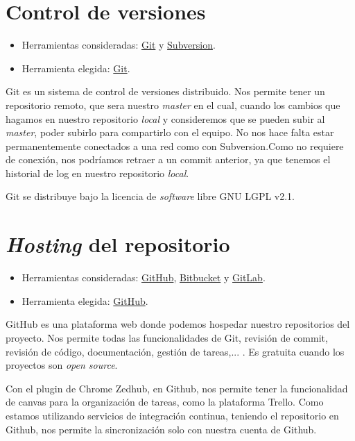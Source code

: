 
\section{Control de versiones}\label{control-de-versiones}

\begin{itemize}
	\tightlist
	\item
	Herramientas consideradas: \href{https://git-scm.com/}{Git} y
	\href{https://subversion.apache.org/}{Subversion}.
	\item
	Herramienta elegida: \href{https://git-scm.com/}{Git}.
\end{itemize}

Git es un sistema de control de versiones distribuido. Nos permite tener un repositorio remoto, que sera nuestro \emph{master} en el cual, cuando los cambios que hagamos en nuestro repositorio \emph{local} y consideremos que se pueden subir al \emph{master}, poder subirlo para compartirlo con el equipo. No nos hace falta estar permanentemente conectados a una red como con Subversion.Como no requiere de conexión, nos podríamos retraer a un commit anterior, ya que tenemos el historial de log en nuestro repositorio \emph{local}. 

Git se distribuye bajo la licencia de \emph{software} libre GNU LGPL v2.1.

\section{\emph{Hosting} del repositorio}\label{hosting-del-repositorio}

\begin{itemize}
	\tightlist
	\item
	Herramientas consideradas: \href{https://github.com/}{GitHub},
	\href{https://bitbucket.org/}{Bitbucket} y
	\href{https://gitlab.com/}{GitLab}.
	\item
	Herramienta elegida: \href{https://github.com/}{GitHub}.
\end{itemize}

GitHub es una plataforma web donde podemos hospedar nuestro repositorios del proyecto.
Nos permite todas las  funcionalidades de Git, revisión de commit, revisión de código,
documentación, gestión de tareas,... . Es
gratuita cuando los proyectos son \emph{open source}.

Con el plugin de Chrome Zedhub, en Github, nos permite tener la funcionalidad de canvas para la organización de tareas, como la plataforma Trello. Como estamos utilizando servicios de integración continua, teniendo el repositorio en Github, nos permite la sincronización solo con nuestra cuenta de Github.

